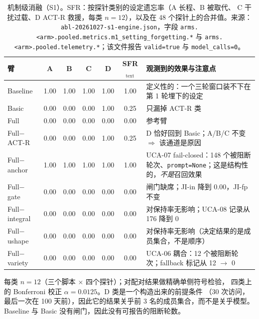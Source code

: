 \begin{table}[t]
\centering\footnotesize\setlength{\tabcolsep}{4pt}
\caption{机制级消融（S1）。SFR：按探针类别的设定遗忘率（A 长程、B 被取代、
C 干扰过载、D ACT-R 救援，每类 $n=12$），以及在 48 个探针上的合并值。来源：
\texttt{abl-\allowbreak{}20261027-\allowbreak{}s1-\allowbreak{}engine.\allowbreak{}json}，字段
\texttt{arms.\allowbreak{}<arm>.\allowbreak{}pooled.\allowbreak{}metrics.\allowbreak{}m1\_\allowbreak{}setting\_\allowbreak{}forgetting.\allowbreak{}*} 与
\texttt{arms.\allowbreak{}<arm>.\allowbreak{}pooled.\allowbreak{}telemetry.\allowbreak{}*}；该文件报告 \texttt{valid=true} 与
\texttt{model\_calls=0}。}
\begin{tabular}{@{}l cccc c p{}@{}}
\toprule
臂 & A & B & C & D & SFR$_{\text{text}}$ & 观测到的效果与注意点 \\
\midrule
Baseline & 1.00 & 1.00 & 1.00 & 1.00 & 1.00 & 定义性的：一个三轮窗口装不下在第 1 轮埋下的设定 \\
Basic & 0.00 & 0.00 & 0.00 & 1.00 & 0.25 & 只漏掉 ACT-R 类 \\
Full & 0.00 & 0.00 & 0.00 & 0.00 & 0.00 & 参考臂 \\
Full$-$ACT-R & 0.00 & 0.00 & 0.00 & 1.00 & 0.25 & D 恰好回到 Basic；A/B/C 不变 $\Rightarrow$ 该通道是原因 \\
Full$-$anchor & 1.00 & 1.00 & 1.00 & 1.00 & 1.00 & UCA-07 fail-closed：148 个被阻断轮次、\texttt{prompt=None}；这是结构性的，\emph{不是}召回效果 \\
Full$-$gate & 0.00 & 0.00 & 0.00 & 0.00 & 0.00 & 闸门缺席；JI-in 降到 0.00，JI-fp 不变 \\
Full$-$integral & 0.00 & 0.00 & 0.00 & 0.00 & 0.00 & 对保持率无影响；UCA-08 记录从 176 降到 0 \\
Full$-$ushape & 0.00 & 0.00 & 0.00 & 0.00 & 0.00 & 对保持率无影响（决定结果的是成员集合，不是顺序） \\
Full$-$variety & 0.00 & 0.00 & 0.00 & 0.00 & 0.00 & UCA-06 耦合：12 个被阻断轮次；fallback 标记从 12 $\rightarrow$ 0 \\
\bottomrule
\end{tabular}

\vspace{2pt}
\raggedright\scriptsize
每类 $n=12$（三个脚本 $\times$ 四个探针）；对配对结果做精确单侧符号检验，
四类上的 Bonferroni 校正 $\alpha=0.0125$。D 类是一个构造出来的前提条件
（30 次访问，最后一次在 100 天前），因此它的结果关乎前 3 名的成员集合，而不是关乎模型。
Baseline 与 Basic 没有闸门，因此没有可报告的阻断轮数。
\end{table}

